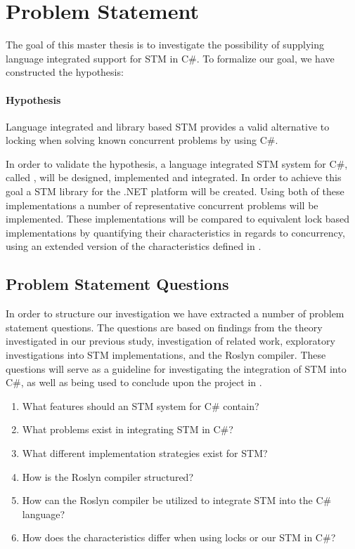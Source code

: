 \section{Problem Statement}\label{sec:problem_statement}
The goal of this master thesis is to investigate the possibility of supplying language integrated support for \ac{STM} in C\#. To formalize our goal, we have constructed the hypothesis:

\paragraph{Hypothesis} Language integrated and library based \ac{STM} provides a valid alternative to locking when solving known concurrent problems by using C\#.

In order to validate the hypothesis, a language integrated \ac{STM} system for C\#, called \stmname, will be designed, implemented and integrated. In order to achieve this goal a \ac{STM} library for the .NET platform will be created. Using both of these implementations a number of representative concurrent problems will be implemented. These implementations will be compared to equivalent lock based implementations by quantifying their characteristics in regards to concurrency, using an extended version of the characteristics defined in \cite[p. 16-21]{dpt907e14trending}.

\subsection{Problem Statement Questions}
In order to structure our investigation we have extracted a number of problem statement questions. The questions are based on findings from the theory investigated in our previous study\cite{dpt907e14trending}, investigation of related work, exploratory investigations into \ac{STM} implementations, and the Roslyn compiler. These questions will serve as a guideline for investigating the integration of \ac{STM} into C\#, as well as being used to conclude upon the project in .

\begin{enumerate}
\item What features should an \ac{STM} system for C\# contain?
\item What problems exist in integrating \ac{STM} in C\#?
\item What different implementation strategies exist for \ac{STM}?
\item How is the Roslyn compiler structured?
\item How can the Roslyn compiler be utilized to integrate \ac{STM} into the C\# language?
\item How does the characteristics differ when using locks or our \ac{STM} in C\#?
\end{enumerate}

